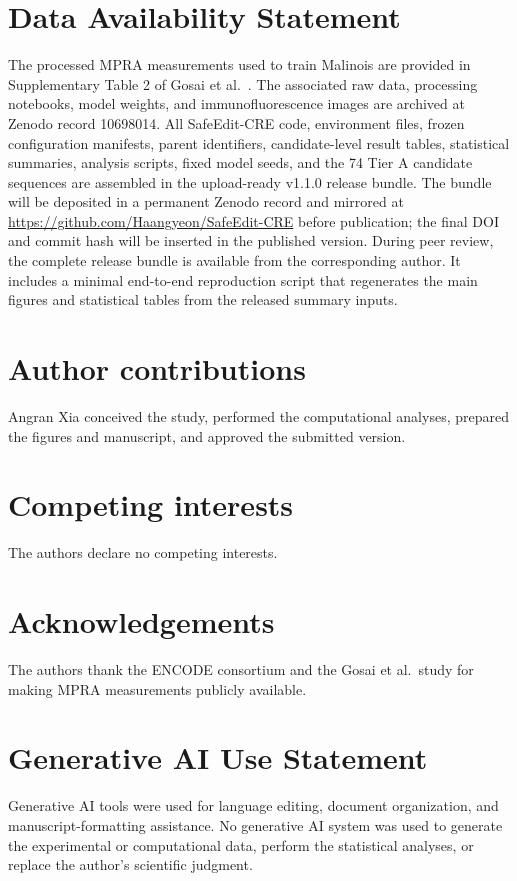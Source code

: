 \documentclass[10pt,a4paper]{article}
\begin{document}
\section*{Data Availability Statement}
The processed MPRA measurements used to train Malinois are provided in Supplementary
Table 2 of Gosai et al.~\citep{Gosai2024}. The associated raw data, processing
notebooks, model weights, and immunofluorescence images are archived at Zenodo record
10698014. All SafeEdit-CRE code, environment files, frozen configuration manifests,
parent identifiers, candidate-level result tables, statistical summaries, analysis
scripts, fixed model seeds, and the 74 Tier A candidate sequences are assembled in
the upload-ready v1.1.0 release bundle. The bundle will be deposited in a permanent
Zenodo record and mirrored at \url{https://github.com/Haangyeon/SafeEdit-CRE} before
publication; the final DOI and commit hash will be inserted in the published version.
During peer review, the complete release bundle is available from the corresponding
author. It includes a minimal end-to-end reproduction script that regenerates the main
figures and statistical tables from the released summary inputs.

\section*{Author contributions}
Angran Xia conceived the study, performed the computational analyses, prepared the
figures and manuscript, and approved the submitted version.

\section*{Competing interests}
The authors declare no competing interests.

\section*{Acknowledgements}
The authors thank the ENCODE consortium and the Gosai et al.~study for making
MPRA measurements publicly available.

\section*{Generative AI Use Statement}
Generative AI tools were used for language editing, document organization, and
manuscript-formatting assistance. No generative AI system was used to generate the
experimental or computational data, perform the statistical analyses, or replace the
author's scientific judgment.

\begingroup
\small


\endgroup
\end{document}
